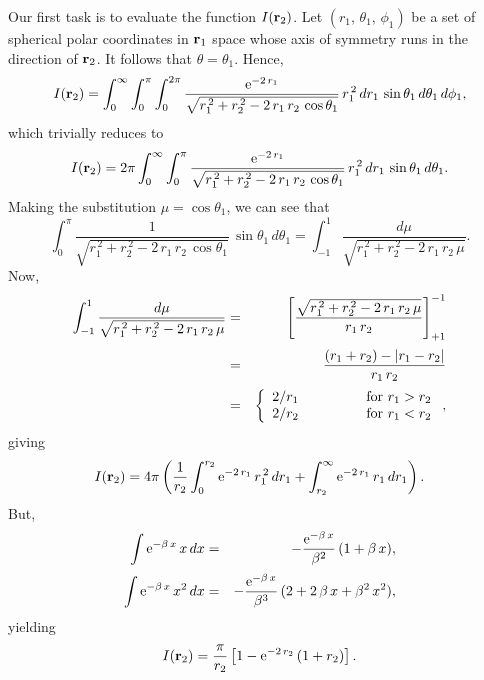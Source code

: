 Our first task is to evaluate the function $I({\bf r}_2)$. Let
$(r_1,\,\theta_1,\,\phi_1)$ be a set of spherical polar coordinates in ${\bf r}_1$
space whose axis of symmetry runs in the direction of ${\bf r}_2$. It follows
that $\theta=\theta_1$. Hence,
\begin{equation}
I({\bf r}_2) = \int_0^\infty\int_0^\pi\int_0^{2\pi}
\frac{{\rm e}^{-2\,r_1}}{\sqrt{r_1^{\,2}+r_2^{\,2}-2\,r_1\,r_2\,\cos\theta_1}}\,
r_1^{\,2}\,dr_1\,\sin\theta_1\,d\theta_1\,d\phi_1,
\end{equation}
which trivially reduces to 
\begin{equation}
I({\bf r}_2) = 2\pi\int_0^\infty\int_0^\pi
\frac{{\rm e}^{-2\,r_1}}{\sqrt{r_1^{\,2}+r_2^{\,2}-2\,r_1\,r_2\,\cos\theta_1}}\,
r_1^{\,2}\,dr_1\,\sin\theta_1\,d\theta_1.
\end{equation}
Making the substitution $\mu=\cos\theta_1$, we can see that
\begin{equation}
\int_0^\pi\frac{1}{\sqrt{r_1^{\,2}+r_2^{\,2}-2\,r_1\,r_2\,\cos\theta_1}}\,
\sin\theta_1\,d\theta_1 = 
\int_{-1}^1 \frac{d\mu}{\sqrt{r_1^{\,2}+r_2^{\,2}-2\,r_1\,r_2\,\mu}}.
\end{equation}
Now,
\begin{eqnarray}
\int_{-1}^1 \frac{d\mu}{\sqrt{r_1^{\,2}+r_2^{\,2}-2\,r_1\,r_2\,\mu}}
&=& \left[\frac{\sqrt{r_1^{\,2}+r_2^{\,2}-2\,r_1\,r_2\,\mu}}{r_1\,r_2}\right]_{+1}^{-1}\nonumber\\[0.5ex]
&=& \frac{(r_1+r_2) - |r_1-r_2|}{r_1\,r_2}\nonumber\\[0.5ex]
&=&\left\{\begin{array}{lcl}2/r_1&\mbox{\hspace{1cm}}&\mbox{for
$r_1>r_2$}\\
2/r_2&&\mbox{for $r_1<r_2$}\end{array}\right.,
\end{eqnarray}
giving
\begin{equation}
I({\bf r}_2) = 4\pi\left(\frac{1}{r_2}\int_0^{r_2}
{\rm e}^{-2\,r_1}\,r_1^{\,2}\,dr_1 + \int_{r_2}^\infty
{\rm e}^{-2\,r_1}\,r_1\,dr_1\right).
\end{equation}
But,
\begin{eqnarray}
\int {\rm e}^{-\beta\,x}\,x\,dx &= &-\frac{{\rm e}^{-\beta\,x}}{\beta^2}\,(1+\beta\,x),\\[0.5ex]
\int{\rm e}^{-\beta\,x}\,x^2\,dx &=& - \frac{{\rm e}^{-\beta\,x}}{\beta^3}\,(2+2\,\beta\,x+\beta^2\,x^2),
\end{eqnarray}
yielding
\begin{equation}
I({\bf r}_2) = \frac{\pi}{r_2}\left[1-{\rm e}^{-2\,r_2}\,(1+r_2)\right].
\end{equation}


